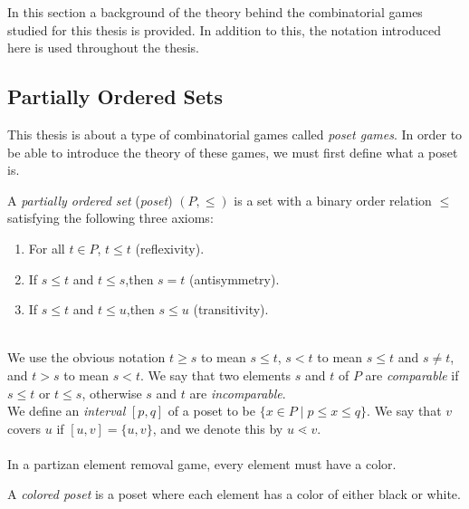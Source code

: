 
In this section a background of the theory behind the combinatorial games studied for this thesis is provided. In addition to this, the notation introduced here is used throughout the thesis. 

\subsection{Partially Ordered Sets}
This thesis is about a type of combinatorial games called \emph{poset games}. In order to be able to introduce the theory of these games, we must first define what a poset is.
\begin{defn}
A \emph{partially ordered set} (\emph{poset}) $(P,\le)$ is a set with a binary order relation $\le$ satisfying the following three axioms:
\begin{enumerate}
\item For all $t\in P$, $t\le t$ (reflexivity).
\item If $s\le t$ and $t\le s$,then $s=t$ (antisymmetry).
\item If $s\le t$ and $t\le u$,then $s\le u$ (transitivity).
\end{enumerate}
\end{defn}
~\\
We use the obvious notation $t\ge s$ to mean $s\le t$, $s<t$ to mean $s\le t$ and $s\ne t$, and $t>s$ to mean $s<t$. We say that two elements $s$ and $t$ of $P$ are \emph{comparable} if $s\le t$ or $t\le s$, otherwise $s$ and $t$ are \emph{incomparable}.
\\
We define an \emph{interval} $[p,q]$ of a poset to be $\{x\in P\;|\;p\le x\le q\}$. We say that $v$ covers $u$ if $[u,v]=\{u,v\}$, and we denote this by $u\lessdot v$.
\\\\
In a partizan element removal game, every element must have a color.
\begin{defn}
A \emph{colored poset} is a poset where each element has a color of either black or white.
\end{defn}
